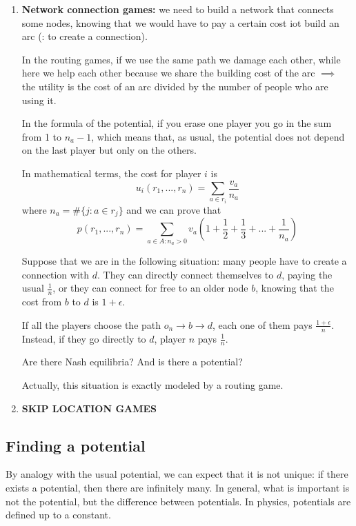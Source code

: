 \begin{enumerate}
	\item \textbf{Network connection games:} we need to build a network that connects 
	some nodes, knowing that we would have to pay a certain cost iot build an 
	arc (: to create a connection).
	
	\noindent In the routing games, if we use the same path we damage each other, 
	while here we help each other because we share the building cost of the 
	arc $\implies$ the utility is the cost of an arc divided by the number of people 
	who are using it.
	
	\noindent In the formula of the potential, if you erase one player you go in 
	the sum from 1 to $n_a-1$, which means that, as usual, the potential does not 
	depend on the last player but only on the others.
	
	\noindent In mathematical terms, the cost for player $i$ is
	\[
		u_i(r_1,...,r_n) = \sum_{a \in r_i}{\frac{v_a}{n_a}}
	\]
	where $n_a = \#\{j: a \in r_j\}$ and we can prove that
	\[
		p(r_1,...,r_n) = \sum_{a \in A: n_a > 0}{v_a\left(1 + \frac{1}{2} + \frac{1}{3} + ... + \frac{1}{n_a}\right)}
	\]
	
	\bigskip
	\noindent Suppose that we are in the following situation:
	many people have to create a connection with $d$. They can directly 
	connect themselves to $d$, paying the usual $\frac{1}{n}$, or they can connect 
	for free to an older node $b$, knowing that the cost from $b$ to $d$ is 
	$1+\epsilon$.
	
	\noindent If all the players choose the path $o_n \rightarrow b \rightarrow 
	d$, each one of them pays $\frac{1+\epsilon}{n}$. Instead, if they go directly 
	to $d$, player $n$ pays $\frac{1}{n}$.
	
	\noindent Are there Nash equilibria? And is there a potential?
	
	\noindent Actually, this situation is exactly modeled by a routing game.
	
	\item \textbf{SKIP LOCATION GAMES}
\end{enumerate}

\subsection*{Finding a potential}

\noindent By analogy with the usual potential, we can expect that it is 
not unique: if there exists a potential, then there are infinitely many. 
In general, what is important is not the potential, but the difference 
between potentials. In physics, potentials are defined up to a constant.


